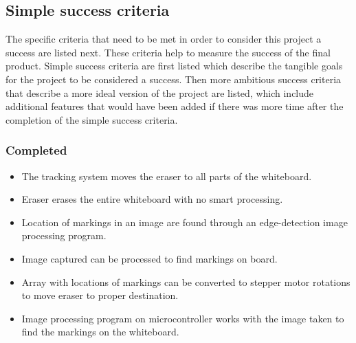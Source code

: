 \subsection{Simple success criteria}
\setlength{\parindent}{2.5ex} The specific criteria that need to be met in order to consider this project a success are listed next. These criteria help to measure the success of the final product. Simple success criteria are first listed which describe the tangible goals for the project to be considered a success. Then more ambitious success criteria that describe a more ideal version of the project are listed, which include additional features that would have been added if there was more time after the completion of the simple success criteria.\\

\subsubsection{Completed}
\begin{itemize}
\item The tracking system moves the eraser to all parts of the whiteboard.
\item Eraser erases the entire whiteboard with no smart processing.
\item Location of markings in an image are found through an edge-detection image processing program.
\item Image captured can be processed to find markings on board.
\item Array with locations of markings can be converted to stepper motor rotations to move eraser to proper destination.
\item Image processing program on microcontroller works with the image taken to find the markings on the whiteboard.\\
\end{itemize}
